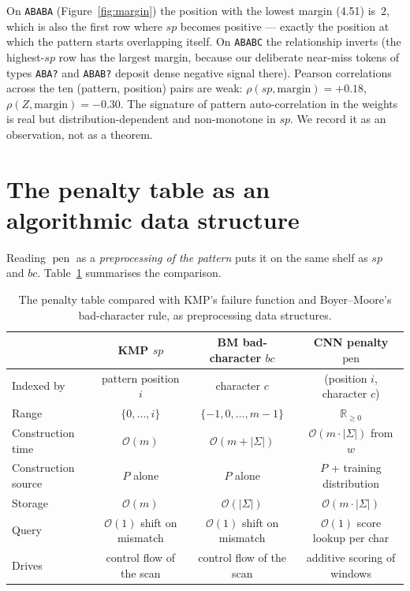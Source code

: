 \documentclass[11pt,a4paper]{article}
\newcommand{\pen}{\operatorname{pen}}
\newcommand{\sigmaalph}{\Sigma}
\newcommand{\bigO}[1]{\mathcal{O}(#1)}
\begin{document}
On \texttt{ABABA} (Figure~\ref{fig:margin}) the position with the
lowest margin (4.51) is~$2$, which is also the first row where $sp$
becomes positive --- exactly the position at which the pattern starts
overlapping itself. On \texttt{ABABC} the relationship inverts (the
highest-$sp$ row has the largest margin, because our deliberate
near-miss tokens of types \texttt{ABA?} and \texttt{ABAB?} deposit
dense negative signal there). Pearson correlations across the ten
(pattern, position) pairs are weak: $\rho(sp, \text{margin})=+0.18$,
$\rho(Z, \text{margin})=-0.30$. The signature of pattern
auto-correlation in the weights is real but distribution-dependent and
non-monotone in $sp$. We record it as an observation, not as a theorem.

\section{The penalty table as an algorithmic data structure}
\label{sec:dstructure}

Reading $\pen$ as a \emph{preprocessing of the pattern} puts it on the
same shelf as $sp$ and $bc$. Table~\ref{tab:datastructures}
summarises the comparison.

\begin{table}[t]
\centering
\small
\begin{tabular}{@{}lccc@{}}
\toprule
 & KMP $sp$ & BM bad-character $bc$ & CNN penalty $\pen$ \\
\midrule
Indexed by                     & pattern position $i$           & character $c$                             & (position $i$, character $c$) \\
Range                          & $\{0,\ldots,i\}$               & $\{-1, 0, \ldots, m-1\}$                  & $\mathbb{R}_{\ge 0}$ \\
Construction time              & $\bigO{m}$                     & $\bigO{m + |\sigmaalph|}$                 & $\bigO{m \cdot |\sigmaalph|}$ from $w$ \\
Construction source            & $P$ alone                      & $P$ alone                                 & $P$ + training distribution \\
Storage                        & $\bigO{m}$                     & $\bigO{|\sigmaalph|}$                     & $\bigO{m \cdot |\sigmaalph|}$ \\
Query                          & $\bigO{1}$ shift on mismatch   & $\bigO{1}$ shift on mismatch              & $\bigO{1}$ score lookup per char \\
Drives                         & control flow of the scan       & control flow of the scan                  & additive scoring of windows \\
\bottomrule
\end{tabular}
\caption{The penalty table compared with KMP's failure function and
Boyer--Moore's bad-character rule, as preprocessing data structures.}
\label{tab:datastructures}
\end{table}
\end{document}
